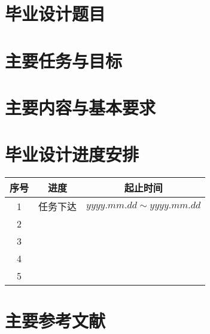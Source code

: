 \section{毕业设计题目}

\makeatletter
\@title
\makeatother

\section{主要任务与目标}

\lipsum[2-3]\cite{chen2005zhulu,chu2004tushu,yuan2012lanc}

\section{主要内容与基本要求}

\lipsum[4-7]\cite{lamport1986document,niu2013zonghe}

\section{毕业设计进度安排}

\begin{table}[!htbp]
    \centering
    \vspace{-2ex}
    \small%
    \begin{tabular}{cp{25em}p{12em}}
        \toprule
        \textbf{序号} & \multicolumn{1}{c}{\textbf{进度}} & \multicolumn{1}{c}{\textbf{起止时间}} \\
        \midrule
        1 & 任务下达 & $yyyy.mm.dd \sim yyyy.mm.dd$ \\
        2 &  &  \\
        3 &  &  \\
        4 &  &  \\
        5 &  &  \\
        \bottomrule
    \end{tabular}
    \vspace{-2ex}
\end{table}

\section{主要参考文献}

